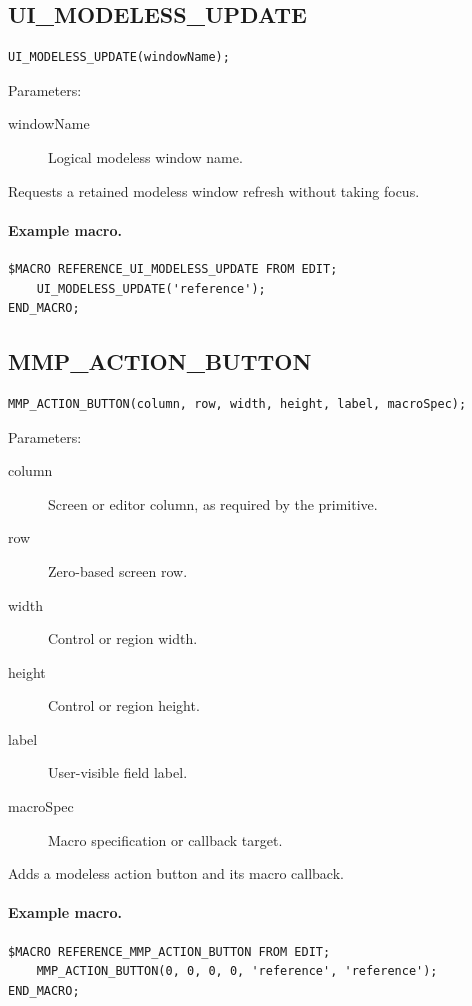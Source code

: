 \documentclass[a4paper,10pt,twoside,openany]{book}
\newenvironment{mrmacextension}{\begin{changebar}}{\end{changebar}}
\begin{document}
\begin{mrmacextension}
\label{prim:procedure-ui-modeless-update}
\subsection*{UI\_MODELESS\_UPDATE}
\begin{verbatim}
UI_MODELESS_UPDATE(windowName);
\end{verbatim}
Parameters:
\begin{description}
\item[windowName] Logical modeless window name.
\end{description}

Requests a retained modeless window refresh without taking focus.

\paragraph{Example macro.}
\begin{verbatim}
$MACRO REFERENCE_UI_MODELESS_UPDATE FROM EDIT;
    UI_MODELESS_UPDATE('reference');
END_MACRO;
\end{verbatim}
\end{mrmacextension}

\begin{mrmacextension}
\label{prim:procedure-mmp-action-button}
\subsection*{MMP\_ACTION\_BUTTON}
\begin{verbatim}
MMP_ACTION_BUTTON(column, row, width, height, label, macroSpec);
\end{verbatim}
Parameters:
\begin{description}
\item[column] Screen or editor column, as required by the primitive.
\item[row] Zero-based screen row.
\item[width] Control or region width.
\item[height] Control or region height.
\item[label] User-visible field label.
\item[macroSpec] Macro specification or callback target.
\end{description}

Adds a modeless action button and its macro callback.

\paragraph{Example macro.}
\begin{verbatim}
$MACRO REFERENCE_MMP_ACTION_BUTTON FROM EDIT;
    MMP_ACTION_BUTTON(0, 0, 0, 0, 'reference', 'reference');
END_MACRO;
\end{verbatim}
\end{mrmacextension}
\end{document}
